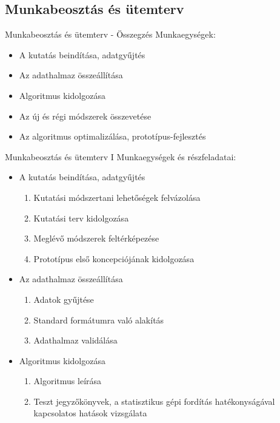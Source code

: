 
\subsection{Munkabeosztás és ütemterv}

\begin{frame}{Munkabeosztás és ütemterv - Összegzés}
Munkaegységek:
\begin{itemize}
  \item {A kutatás beindítása, adatgyűjtés}
  \item {Az adathalmaz összeállítása}
  \item {Algoritmus kidolgozása}
  \item {Az új és régi módszerek összevetése}
  \item {Az algoritmus optimalizálása, prototípus-fejlesztés}
  \end{itemize}
\end{frame}


\begin{frame}{Munkabeosztás és ütemterv I}
Munkaegységek és részfeladatai:
\begin{itemize}
  \item<1-> {
    A kutatás beindítása, adatgyűjtés
    \begin{enumerate}
	    \item Kutatási módszertani lehetőségek felvázolása
	    \item Kutatási terv kidolgozása
	    \item Meglévő módszerek feltérképezése
	    \item Prototípus első koncepciójának kidolgozása
    \end{enumerate}
  }
  \item<2-> {   
    Az adathalmaz összeállítása
    \begin{enumerate}
        \item Adatok gyűjtése
        \item Standard formátumra való alakítás
        \item Adathalmaz validálása
    \end{enumerate}
  }
  \item<3-> {
    Algoritmus kidolgozása
    \begin{enumerate}
        \item Algoritmus leírása
        \item Teszt jegyzőkönyvek, a statisztikus gépi fordítás hatékonyságával kapcsolatos hatások vizsgálata
    \end{enumerate}
  }
  \end{itemize}
\end{frame}


